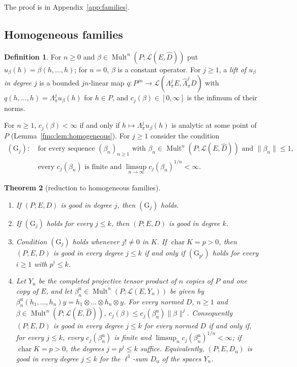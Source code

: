 \documentclass[11pt]{amsart}
\newtheorem{theorem}{Theorem}[section]
\theoremstyle{definition}
\newtheorem{definition}[theorem]{Definition}
\theoremstyle{remark}
\numberwithin{equation}{section}
\newcommand{\cL}{\mathcal L}
\newcommand{\Mult}{\operatorname{Mult}}
\newcommand{\norm}[1]{\lVert #1\rVert}
\theoremstyle{plain}
\theoremstyle{definition}
\theoremstyle{plain}
\newcommand{\hLambda}{\widehat\Lambda}
\begin{document}
The proof is in Appendix~\ref{app:families}.

\subsection{Homogeneous families}\label{fam2:ssec:reduction}

\begin{definition}\label{fam2:def:lifting}
For $n\ge0$ and $\beta\in\Mult^n(P;\cL(E,\widehat D))$ put $u_\beta(h)=\beta(h,\dots,h)$; for $n=0$, $\beta$ is a constant
operator. For $j\ge1$, a \emph{lift of $u_\beta$ in degree $j$} is a bounded $jn$-linear map
$q\colon P^{jn}\to\cL(\Lambda^j_\pi E,\hLambda^j_\pi D)$ with $q(h,\dots,h)=\Lambda^j_\pi u_\beta(h)$ for $h\in P$, and
$c_j(\beta)\in[0,\infty]$ is the infimum of their norms.
\end{definition}

For $n\ge1$, $c_j(\beta)<\infty$ if and only if $h\mapsto\Lambda^j_\pi u_\beta(h)$ is analytic at some point of $P$
(Lemma~\ref{fmo:lem:homogeneous}). For $j\ge1$ consider the condition
\begin{equation}\label{fam2:eq:G}
\begin{aligned}
 (\mathrm G_j)\colon\ &\text{for every sequence $(\beta_n)_{n\ge1}$ with $\beta_n\in\Mult^n(P;\cL(E,\widehat D))$ and
 $\norm{\beta_n}\le1$,}\\
 &\text{every $c_j(\beta_n)$ is finite and $\limsup_{n\to\infty}c_j(\beta_n)^{1/n}<\infty$.}
\end{aligned}
\end{equation}

\begin{theorem}[reduction to homogeneous families]\label{fam2:thm:reduction}
\begin{enumerate}
\item If $(P;E,D)$ is good in degree $j$, then $(\mathrm G_j)$ holds.
\item If $(\mathrm G_j)$ holds for every $j\le k$, then $(P;E,D)$ is good in degree $k$.
\item Condition $(\mathrm G_j)$ holds whenever $j!\ne0$ in $K$. If $\operatorname{char}K=p>0$, then $(P;E,D)$ is good in
every degree $j\le k$ if and only if $(\mathrm G_{p^i})$ holds for every $i\ge1$ with $p^i\le k$.
\item Let $Y_n$ be the completed projective tensor product of $n$ copies of $P$ and one copy of $E$, and let
$\beta^{\mathrm u}_n\in\Mult^n(P;\cL(E,Y_n))$ be given by
$\beta^{\mathrm u}_n(h_1,\dots,h_n)y=h_1\otimes\dots\otimes h_n\otimes y$. For every normed $D$, $n\ge1$ and
$\beta\in\Mult^n(P;\cL(E,\widehat D))$, $c_j(\beta)\le c_j(\beta^{\mathrm u}_n)\norm\beta^j$. Consequently $(P;E,D)$ is good
in every degree $j\le k$ for every normed $D$ if and only if, for every $j\le k$, every $c_j(\beta^{\mathrm u}_n)$ is finite
and $\limsup_nc_j(\beta^{\mathrm u}_n)^{1/n}<\infty$; if $\operatorname{char}K=p>0$, the degrees $j=p^i\le k$ suffice.
Equivalently, $(P;E,D_{\mathrm u})$ is good in every degree $j\le k$ for the $\ell^1$-sum $D_{\mathrm u}$ of the spaces
$Y_n$.
\end{enumerate}
\end{theorem}
\end{document}
